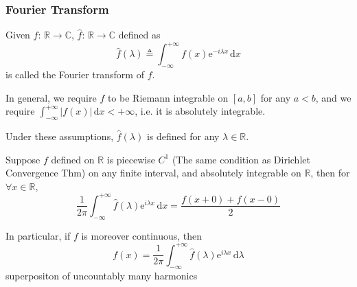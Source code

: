 \subsubsection[Fourier 变换]{Fourier Transform}

Given $f:\,\mathbb{R}\to\mathbb{C}$, $\hat{f}:\,\mathbb{R}\to\mathbb{C}$ defined as
$$\hat{f}(\lambda)\triangleq\int_{-\infty}^{+\infty}f(x)\mathrm{e}^{-i\lambda x}\,\mathrm{d}x$$
is called the Fourier transform of $f$.

\begin{remark}
    In general, we require $f$ to be Riemann integrable on $[a,b]$ for any $a<b$, and we require $\int_{-\infty}^{+\infty}\left|f(x)\right|\,\mathrm{d}x<+\infty$, i.e. it is absolutely integrable.

    Under these assumptions, $\hat{f}(\lambda)$ is defined for any $\lambda\in\mathbb{R}$.
\end{remark}

\begin{theorem}
    Suppose $f$ defined on $\mathbb{R}$ is piecewise $C^1$ (The same condition as Dirichlet Convergence Thm) on any finite interval, and absolutely integrable on $\mathbb{R}$, then for $\forall x\in\mathbb{R}$,
    $$\frac{1}{2\pi}\int_{-\infty}^{+\infty}\hat{f}(\lambda)\mathrm{e}^{i\lambda x}\,\mathrm{d}x=\frac{f(x+0)+f(x-0)}{2}$$

    In particular, if $f$ is moreover continuous, then
    $$f(x)=\frac{1}{2\pi}\int_{-\infty}^{+\infty}\hat{f}(\lambda)\mathrm{e}^{i\lambda x}\,\mathrm{d}\lambda$$
    superpositon of uncountably many harmonics
\end{theorem}

